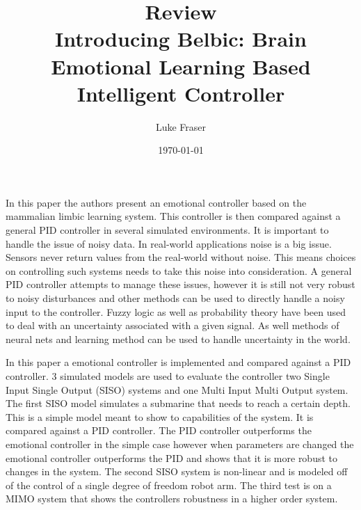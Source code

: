 \documentclass{article}
\begin{document}
\title{{\large Review} \\ Introducing Belbic: Brain Emotional Learning Based Intelligent Controller}
\author{Luke Fraser}
\date{\today}
\maketitle

\begingroup
\renewcommand{\section}[2]{}


\endgroup

\section*{Summary}
In this paper the authors present an emotional controller based on the mammalian limbic learning system. This controller is then compared against a general PID controller in several simulated environments. It is important to handle the issue of noisy data. In real-world applications noise is a big issue. Sensors never return values from the real-world without noise. This means choices on controlling such systems needs to take this noise into consideration. A general PID controller attempts to manage these issues, however it is still not very robust to noisy disturbances and other methods can be used to directly handle a noisy input to the controller. Fuzzy logic as well as probability theory have been used to deal with an uncertainty associated with a given signal. As well methods of neural nets and learning method can be used to handle uncertainty in the world.

In this paper a emotional controller is implemented and compared against a PID controller. 3 simulated models are used to evaluate the controller two Single Input Single Output (SISO) systems and one Multi Input Multi Output system. The first SISO model simulates a submarine that needs to reach a certain depth. This is a simple model meant to show to capabilities of the system. It is compared against a PID controller. The PID controller outperforms the emotional controller in the simple case however when parameters are changed the emotional controller outperforms the PID and shows that it is more robust to changes in the system. The second SISO system is non-linear and is modeled off of the control of a single degree of freedom robot arm. The third test is on a MIMO system that shows the controllers robustness in a higher order system.
\end{document}
